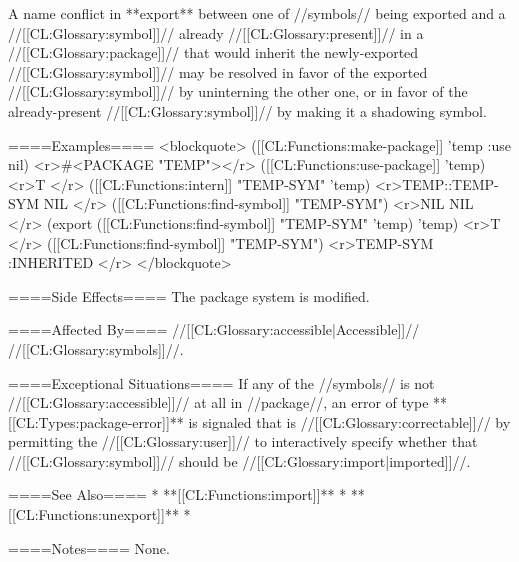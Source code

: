 A name conflict in **export** between one of //symbols// being exported and a //[[CL:Glossary:symbol]]// already //[[CL:Glossary:present]]// in a //[[CL:Glossary:package]]// that would inherit the newly-exported //[[CL:Glossary:symbol]]// may be resolved in favor of the exported //[[CL:Glossary:symbol]]// by uninterning the other one, or in favor of the already-present //[[CL:Glossary:symbol]]// by making it a shadowing symbol.

====Examples====
<blockquote>
([[CL:Functions:make-package]] 'temp :use nil) <r>#<PACKAGE "TEMP"></r>
([[CL:Functions:use-package]] 'temp) <r>T </r>
([[CL:Functions:intern]] "TEMP-SYM" 'temp) <r>TEMP::TEMP-SYM
NIL </r>
([[CL:Functions:find-symbol]] "TEMP-SYM") <r>NIL
NIL </r>
(export ([[CL:Functions:find-symbol]] "TEMP-SYM" 'temp) 'temp) <r>T </r>
([[CL:Functions:find-symbol]] "TEMP-SYM") <r>TEMP-SYM
:INHERITED </r>
</blockquote>

====Side Effects====
The package system is modified.

====Affected By====
//[[CL:Glossary:accessible|Accessible]]// //[[CL:Glossary:symbols]]//.

====Exceptional Situations====
If any of the //symbols// is not //[[CL:Glossary:accessible]]// at all in //package//, an error of type **[[CL:Types:package-error]]** is signaled that is //[[CL:Glossary:correctable]]// by permitting the //[[CL:Glossary:user]]// to interactively specify whether that //[[CL:Glossary:symbol]]// should be //[[CL:Glossary:import|imported]]//.

====See Also====
  * **[[CL:Functions:import]]**
  * **[[CL:Functions:unexport]]**
  * {\secref\PackageConcepts}

====Notes====
None.

